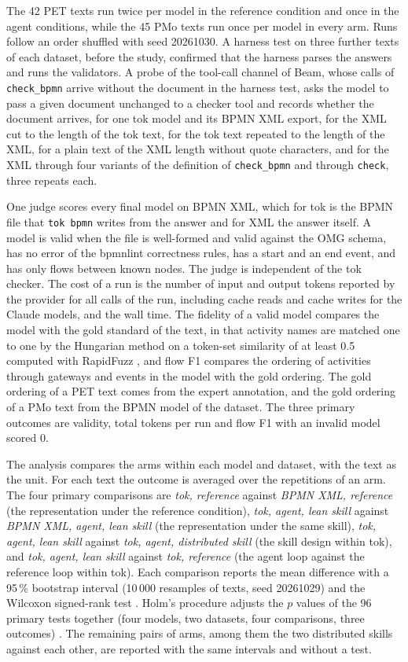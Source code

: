 \documentclass[11pt,a4paper]{article}
\begin{document}
The 42 PET texts run twice per model in the reference condition and once in the agent conditions, while the 45 PMo texts run once per model in every arm. Runs follow an order shuffled with seed 20261030. A harness test on three further texts of each dataset, before the study, confirmed that the harness parses the answers and runs the validators. A probe of the tool-call channel of Beam, whose calls of \texttt{check\_bpmn} arrive without the document in the harness test, asks the model to pass a given document unchanged to a checker tool and records whether the document arrives, for one tok model and its BPMN XML export, for the XML cut to the length of the tok text, for the tok text repeated to the length of the XML, for a plain text of the XML length without quote characters, and for the XML through four variants of the definition of \texttt{check\_bpmn} and through \texttt{check}, three repeats each.

One judge scores every final model on BPMN XML, which for tok is the BPMN file that \texttt{tok bpmn} writes from the answer and for XML the answer itself. A model is valid when the file is well-formed and valid against the OMG schema, has no error of the bpmnlint correctness rules, has a start and an end event, and has only flows between known nodes. The judge is independent of the tok checker. The cost of a run is the number of input and output tokens reported by the provider for all calls of the run, including cache reads and cache writes for the Claude models, and the wall time. The fidelity of a valid model compares the model with the gold standard of the text, in that activity names are matched one to one by the Hungarian method \citep{Kuhn1955hungarian} on a token-set similarity of at least 0.5 computed with RapidFuzz \citep{rapidfuzz}, and flow F1 compares the ordering of activities through gateways and events in the model with the gold ordering. The gold ordering of a PET text comes from the expert annotation, and the gold ordering of a PMo text from the BPMN model of the dataset. The three primary outcomes are validity, total tokens per run and flow F1 with an invalid model scored 0.

The analysis compares the arms within each model and dataset, with the text as the unit. For each text the outcome is averaged over the repetitions of an arm. The four primary comparisons are \emph{tok, reference} against \emph{BPMN XML, reference} (the representation under the reference condition), \emph{tok, agent, lean skill} against \emph{BPMN XML, agent, lean skill} (the representation under the same skill), \emph{tok, agent, lean skill} against \emph{tok, agent, distributed skill} (the skill design within tok), and \emph{tok, agent, lean skill} against \emph{tok, reference} (the agent loop against the reference loop within tok). Each comparison reports the mean difference with a 95\,\% bootstrap interval (10\,000 resamples of texts, seed 20261029) and the Wilcoxon signed-rank test \citep{Wilcoxon1945,Efron1979}. Holm's procedure adjusts the $p$ values of the 96 primary tests together (four models, two datasets, four comparisons, three outcomes) \citep{Holm1979}. The remaining pairs of arms, among them the two distributed skills against each other, are reported with the same intervals and without a test.
\end{document}
